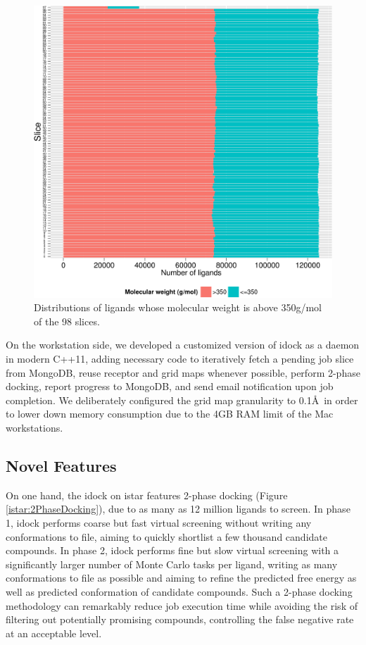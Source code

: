 \begin{figure}
\centering
\includegraphics[width=\linewidth]{istar/gt350.pdf}
\caption{Distributions of ligands whose molecular weight is above 350g/mol of the 98 slices.}
\label{istar:gt350}
\end{figure}

On the workstation side, we developed a customized version of idock as a daemon in modern C++11, adding necessary code to iteratively fetch a pending job slice from MongoDB, reuse receptor and grid maps whenever possible, perform 2-phase docking, report progress to MongoDB, and send email notification upon job completion. We deliberately configured the grid map granularity to 0.1\AA\ in order to lower down memory consumption due to the 4GB RAM limit of the Mac workstations.

\subsection{Novel Features}

On one hand, the idock on istar features 2-phase docking (Figure \ref{istar:2PhaseDocking}), due to as many as 12 million ligands to screen. In phase 1, idock performs coarse but fast virtual screening without writing any conformations to file, aiming to quickly shortlist a few thousand candidate compounds. In phase 2, idock performs fine but slow virtual screening with a significantly larger number of Monte Carlo tasks per ligand, writing as many conformations to file as possible and aiming to refine the predicted free energy as well as predicted conformation of candidate compounds. Such a 2-phase docking methodology can remarkably reduce job execution time while avoiding the risk of filtering out potentially promising compounds, controlling the false negative rate at an acceptable level.

